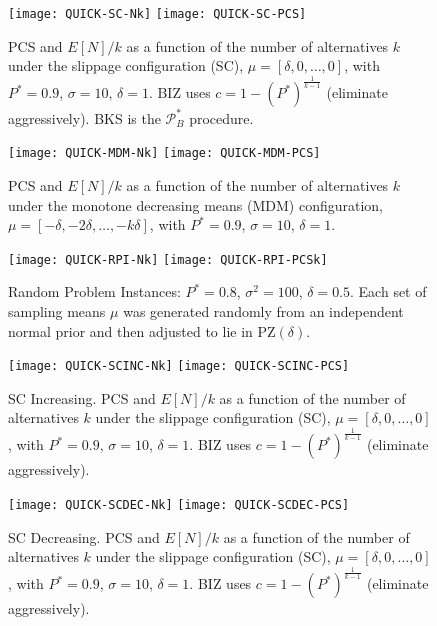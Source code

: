 \documentclass[12pt]{article}
\newcommand{\PstarB}{\mathcal{P}^*_B}
\newcommand{\E}{E}
\newcommand{\sigmacom}{\sigma}
\newcommand{\cmax}{1-(P^*)^{\frac1{k-1}}}
\newcommand{\PZ}{\mbox{PZ}}
\begin{document}
  \begin{figure}[tb]
    \center
    \texttt{[image: QUICK-SC-Nk]} 
    \texttt{[image: QUICK-SC-PCS]}
    \caption{PCS and $\E[N]/k$ as a function of the number of alternatives $k$ under the slippage configuration (SC),
    $\mu=[\delta,0,\ldots,0]$, with $P^*=0.9$, $\sigmacom=10$,
    $\delta=1$.
    BIZ uses $c=\cmax$ (eliminate aggressively).  
    BKS is the $\PstarB$ procedure.
    \label{fig:SC}}
  \end{figure}

  \begin{figure}[tb]
    \center
    \texttt{[image: QUICK-MDM-Nk]} 
    \texttt{[image: QUICK-MDM-PCS]}
    \caption{PCS and $\E[N]/k$ as a function of the number of alternatives $k$ under the monotone
    decreasing means (MDM) configuration, $\mu=[-\delta,-2\delta,\ldots,-k\delta]$,
    with $P^*=0.9$, $\sigmacom=10$, $\delta=1$.  
    \label{fig:MDM}}
  \end{figure}

  \begin{figure}[tb]
    \center
    \texttt{[image: QUICK-RPI-Nk]}
    \texttt{[image: QUICK-RPI-PCSk]}
    \caption{Random Problem Instances:
    $P^* = 0.8$, $\sigma^2=100$, $\delta=0.5$.  Each set of sampling means $\mu$ was generated randomly from an independent normal prior and then 
    adjusted to lie in $\PZ(\delta)$.
    \label{fig:RPI}}
  \end{figure}

  \begin{figure}[tb]
    \center
    \texttt{[image: QUICK-SCINC-Nk]} 
    \texttt{[image: QUICK-SCINC-PCS]}
    \caption{SC Increasing.  
    PCS and $\E[N]/k$ as a function of the number of alternatives $k$ under the slippage configuration (SC),
    $\mu=[\delta,0,\ldots,0]$, with $P^*=0.9$, $\sigmacom=10$,
    $\delta=1$.
    BIZ uses $c=\cmax$ (eliminate aggressively).  
    \label{fig:SCINC}}
  \end{figure}
  
  \begin{figure}[tb]
    \center
    \texttt{[image: QUICK-SCDEC-Nk]} 
    \texttt{[image: QUICK-SCDEC-PCS]}
    \caption{SC Decreasing.  
    PCS and $\E[N]/k$ as a function of the number of alternatives $k$ under the slippage configuration (SC),
    $\mu=[\delta,0,\ldots,0]$, with $P^*=0.9$, $\sigmacom=10$,
    $\delta=1$.
    BIZ uses $c=\cmax$ (eliminate aggressively).  
    \label{fig:SCDEC}}
  \end{figure}
\end{document}
